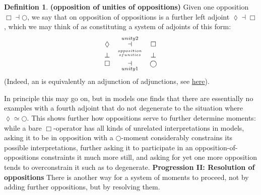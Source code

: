 \documentclass[12pt,titlepage]{article}
\newcommand{\itexarray}[1]{\begin{matrix}#1\end{matrix}}
\theoremstyle{plain}
\theoremstyle{definition}
\newtheorem{defn}{Definition}
\theoremstyle{remark}
\begin{document}
\begin{defn}
\label{HigherOrderOpposition}\hypertarget{HigherOrderOpposition}{}
\textbf{(opposition of unities of oppositions)}
Given one opposition $\Box \dashv \bigcirc$, we say that on opposition of oppositions is a further left adjoint $\lozenge \dashv \Box$, which we may think of as constituting a system of adjoints of this form:
\begin{displaymath}
\itexarray{
\lozenge &\overset{unity2}{\dashv}& \Box
\\
\bot &\stackrel{opposition \atop {ofunities}}{}& \bot
\\
\Box &\underset{unity1}{\dashv}& \bigcirc
}
\end{displaymath}
(Indeed, an  is equivalently an adjunction of adjunctions, see \href{http://ncatlab.org/nlab/show/adjoint+triple#AsAdjunctionOfAdjunctions}{here}).
\end{defn}
In principle this may go on, but in models one finds that there are essentially no examples with a fourth adjoint that do not degenerate to the  situation where $\lozenge \simeq \bigcirc$.
This shows further how oppositions serve to further determine moments: while a bare $\Box$-operator has all kinds of unrelated interpretations in models, asking it to be in opposition with a $\bigcirc$-moment considerably constrains its possible interpretations, further asking it to participate in an opposition-of-oppositions constraints it much more still, and asking for yet one more opposition tends to overconstrain it such as to degenerate.
\textbf{Progression II: Resolution of oppositions}
There is another way for a system of moments to proceed, not by adding further oppositions, but by resolving them.
\end{document}

